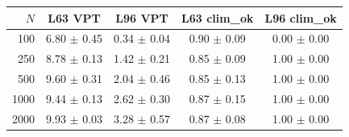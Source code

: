 \begin{tabular}{rcccc}\toprule
$N$ & L63 VPT & L96 VPT & L63 clim\_ok & L96 clim\_ok\\
\midrule
100 & 6.80 $\pm$ 0.45 & 0.34 $\pm$ 0.04 & 0.90 $\pm$ 0.09 & 0.00 $\pm$ 0.00\\
250 & 8.78 $\pm$ 0.13 & 1.42 $\pm$ 0.21 & 0.85 $\pm$ 0.09 & 1.00 $\pm$ 0.00\\
500 & 9.60 $\pm$ 0.31 & 2.04 $\pm$ 0.46 & 0.85 $\pm$ 0.13 & 1.00 $\pm$ 0.00\\
1000 & 9.44 $\pm$ 0.13 & 2.62 $\pm$ 0.30 & 0.87 $\pm$ 0.15 & 1.00 $\pm$ 0.00\\
2000 & 9.93 $\pm$ 0.03 & 3.28 $\pm$ 0.57 & 0.87 $\pm$ 0.08 & 1.00 $\pm$ 0.00\\
\bottomrule\end{tabular}
